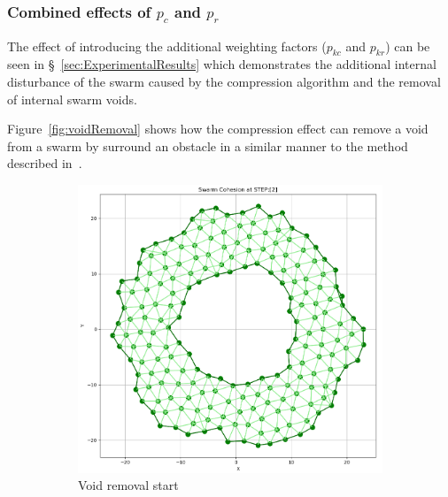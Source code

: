 \documentclass[12pt,a4paper]{IEEEtran}
\begin{document}
\subsubsection{Combined effects of $p_c$ and $p_r$}

The effect of introducing the additional weighting factors ($p_{kc}$ and $p_{kr}$) can be seen in \S~\ref{sec:ExperimentalResults} which demonstrates the additional internal disturbance of the swarm caused by the compression algorithm and the removal of internal swarm voids. 

Figure~\ref{fig:voidRemoval} shows how the compression effect can remove a void from a swarm by surround an obstacle in a similar manner to the method described in~\cite{eliot2019void}.

\begin{figure}[ht]
	\centering
	\begin{subfigure}{0.4\textwidth}
		\centering	
		\includegraphics[width=1.0\linewidth]{figures/voidRemoval1}
		\caption[Void removal start]{Void removal start}
		\label{fig:voidRemovalStart}
	\end{subfigure}
	\begin{subfigure}{0.4\textwidth}
		\centering

\end{subfigure}
\end{figure}
\end{document}
